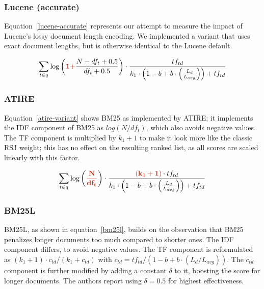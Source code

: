 \subsubsection{Lucene (accurate)}

Equation~\ref{lucene-accurate} represents our attempt to measure the impact of Lucene’s lossy document length encoding. We implemented a variant that uses exact document lengths, but is otherwise identical to the Lucene default.

\begin{equation}
	\label{lucene-accurate}
	\sum_{t\in q}\log\left(\mathbf{\begingroup\color{ruhuisstijlrood}1 +\endgroup} \frac{N-df_t+0.5}{df_t+0.5}\right)\cdot\frac{tf_{td}}{k_1\cdot \left(1-b+b\cdot\left(\frac{L_d}{L_{avg}}\right)\right)+tf_{td}}
\end{equation}

\subsubsection{ATIRE~\cite{ATIRE}}
Equation~\ref{atire-variant} shows BM25 as implemented by ATIRE; it implements the IDF component of BM25 as $log(N/df_{t})$, which also avoids negative values. The TF component is multiplied by $k_1+1$ to make it look more like the classic RSJ weight; this has no effect on the resulting ranked list, as all scores are scaled linearly with this factor.

\begin{equation}
	\label{atire-variant}
	\sum_{t\in q}\log\left(\mathbf{\begingroup\color{ruhuisstijlrood}\frac{N}{df_t}\endgroup}\right)\cdot\frac{\mathbf{\begingroup\color{ruhuisstijlrood}\left(k_1 + 1\right)\endgroup}\cdot tf_{td}}{k_1\cdot\left(1-b+b\cdot\left(\frac{L_{d}}{L_{avg}}\right)\right)+tf_{td}}
\end{equation}

\subsubsection{BM25L~\cite{bm25l}}
BM25L, as shown in equation~\ref{bm25l}, builds on the observation that BM25 penalizes longer documents too much compared to shorter ones. The IDF component differs, to avoid negative values. The TF component is reformulated as $(k_1+1)\cdot c_{td} / (k_1+c_{td})$ with $c_{td} = tf_{td} / (1 - b + b \cdot (L_d/L_{avg}))$. The $c_{td}$ component is further modified by adding a constant $\delta$ to it, boosting the score for longer documents. The authors report using $\delta = 0.5$ for highest effectiveness.

